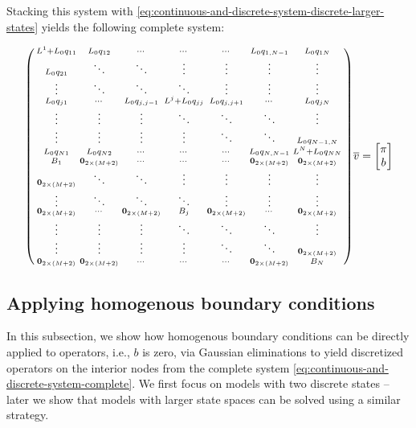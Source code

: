 \documentclass[11pt]{article}
\newenvironment{psmallmatrix}
{\left(\begin{smallmatrix}}
	{\end{smallmatrix}\right)}
\theoremstyle{definition}
\begin{document}
Stacking this system with \eqref{eq:continuous-and-discrete-system-discrete-larger-states} yields the following complete system:


\begin{align}
\begin{psmallmatrix}
{L}^1 + L_0 q_{11} & L_0 q_{12} & \cdots &  \cdots & \cdots & L_0 q_{1,N-1} & L_0 q_{1N} \\ 
L_0 q_{21} & \ddots & \ddots & \vdots & \vdots & \vdots & \vdots  \\
\vdots & \ddots & \ddots & \ddots  & \vdots & \vdots & \vdots
\\
L_0 q_{j1} &  \cdots & L_0 q_{j,j-1} & {L}^j + L_0 q_{jj} & L_0 q_{j,j+1} & \cdots & L_0 q_{jN} \\
\vdots & \vdots& \vdots &  \ddots & \ddots & \ddots  & \vdots \\ 
\vdots & \vdots  & \vdots& \vdots &  \ddots & \ddots & L_0 q_{N-1,N} \\
L_0 q_{N1} & L_0 q_{N2} & \cdots &  \cdots & \cdots & L_0 q_{N,N-1} & {L}^N + L_0 q_{NN} \\
B_1 & \mathbf{0}_{2 \times (M+2)} & \cdots &  \cdots & \cdots & \mathbf{0}_{2 \times (M+2)}  & \mathbf{0}_{2 \times (M+2)} \\ 
\mathbf{0}_{2 \times (M+2)} & \ddots & \ddots & \vdots & \vdots & \vdots & \vdots  \\
\vdots & \ddots & \ddots & \ddots  & \vdots & \vdots & \vdots
\\
\mathbf{0}_{2 \times (M+2)} &  \cdots & \mathbf{0}_{2 \times (M+2)} & B_j & \mathbf{0}_{2 \times (M+2)} & \cdots & \mathbf{0}_{2 \times (M+2)} \\
\vdots & \vdots& \vdots &  \ddots & \ddots & \ddots  & \vdots \\ 
\vdots & \vdots  & \vdots& \vdots &  \ddots & \ddots & \mathbf{0}_{2 \times (M+2)} \\
\mathbf{0}_{2 \times (M+2)} & \mathbf{0}_{2 \times (M+2)} & \cdots &  \cdots & \cdots & \mathbf{0}_{2 \times (M+2)} & B_N
\end{psmallmatrix}
\overline{v}
=
\begin{bmatrix}
\pi \\ b
\end{bmatrix} 
\label{eq:continuous-and-discrete-system-complete-larger-states}
\end{align}

\subsection{Applying homogenous boundary conditions}
In this subsection, we show how homogenous boundary conditions can be directly applied to operators, i.e., $b$ is zero, via Gaussian eliminations to yield discretized operators on the interior nodes from the complete system \eqref{eq:continuous-and-discrete-system-complete}. We first focus on models with two discrete states -- later we show that models with larger state spaces can be solved using a similar strategy.
\end{document}
